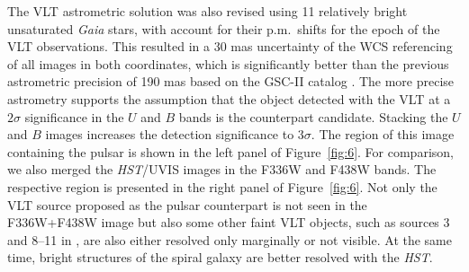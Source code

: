 \documentclass[pdftex,twocolumn]{aastex62}
\newcommand{\gp}[1]{{\color{blue} #1}}
\begin{document}
The VLT astrometric solution was also revised using 11 relatively bright unsaturated {\sl Gaia} stars, 
with account for their p.m.\ shifts for  the epoch of the VLT observations.  This   
resulted in a 30 mas uncertainty  of the WCS  referencing of all images  in both coordinates, which is significantly better than the previous  astrometric %
precision of 190 mas %
based on the GSC-II catalog \citep{Mignani2008}. 
The more precise astrometry  
supports the assumption that the object detected with the VLT 
at a $2\sigma$ significance  in the $U$ and $B$ bands is the counterpart candidate.
Stacking the $U$ and $B$ images 
increases the detection significance to $3\sigma$.
The region of this image containing the pulsar  is shown in the left panel of Figure~\ref{fig:6}. 
For comparison, we also merged the {\sl HST}/UVIS images in the F336W and F438W bands.  
The respective region   
is  presented in the right panel of Figure~\ref{fig:6}. %
Not only the VLT source proposed  as the pulsar counterpart is not seen in the F336W+F438W image but also some other faint 
VLT objects, such as sources 3 and 8--11  %
in \citet{Mignani2003},  are also either resolved only marginally or not visible.
At the same time, bright structures of the spiral galaxy are better resolved with the {\sl HST}.  
\end{document}
